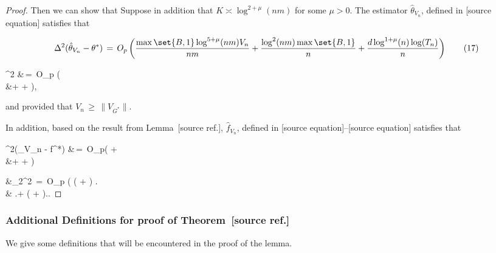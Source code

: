 \documentclass[twoside,11pt]{article}
\makeatletter
\newcommand{\discardlabel}[1]{}
\newcommand{\discardtwo}[2]{}
\newcommand{\legacyref}[1]{\textup{[source ref.]}}
\newcommand{\legacyeqref}[1]{\textup{[source equation]}}
\newenvironment{legacycomparison}{%
  \begingroup\color{legacygray}%
  \let\label\discardlabel
  \let\originallabel\discardlabel
  \let\ref\legacyref
  \let\pageref\legacyref
  \let\eqref\legacyeqref
  \let\cref\legacyref
  \let\Cref\legacyref
  \let\autoref\legacyref
  \let\aliasref\discardtwo
}{\endgroup}
\newcommand{\aliasref}[2]{%
  \@ifundefined{r@#2}{}{%
    \expandafter\let\csname r@#1\expandafter\endcsname\csname r@#2\endcsname}}
\makeatother
\begin{document}
\begin{legacycomparison}
\begin{proof}
Then we can show that 
Suppose in addition that \( K \asymp \log^{2+\mu}(nm) \) for some \( \mu > 0 \). The estimator \( \hat{\theta}_{V_n} \), defined in \eqref{def_knn} satisfies that

\begin{equation}
\Delta^2(\hat{\theta}_{V_n} - \theta^*) \,=\, O_p\left(\frac{ \max\set{B,1} \log^{5+\mu}(nm)V_n}{nm} + \frac{\log^2(nm)\max\set{B,1}}{n} + \frac{d \log^{1+\mu}(n) \log(T_n)}{n}\right) \tag{17}
\end{equation}




\bea
\label{knn_loss_1__duplicate2}
^2 &\,=\, O_p \bigg( \\
&\qquad\qquad +  + \bigg),
\bea  


and provided that \( V_n \,\geq\, \|V_{G^*}\| \). 


In addition, based on the result from Lemma~\ref{knn_f}, \( \hat{f}_{V_n} \), defined in \eqref{np_knn1}--\eqref{np_knn2} satisfies that

\bea
\Delta^2(_{V_n} - f^*)  &\,=\, O_p\bigg( +  \\
&\qquad\qquad +  +  \bigg)
\bea

\bea 
&_2^2 \,=\, O_p \biggl(  \max{} \biggl(   +   \biggr) \biggr. \\ & \quad \biggl.+ \max{}\cdot \left( + \right).\biggr.
\bea   
\end{proof}

\subsubsection{Additional Definitions for proof of Theorem~\ref{Theorem_5}}
We give some definitions that will be encountered in the proof of the lemma.  


\end{legacycomparison}
\end{document}

